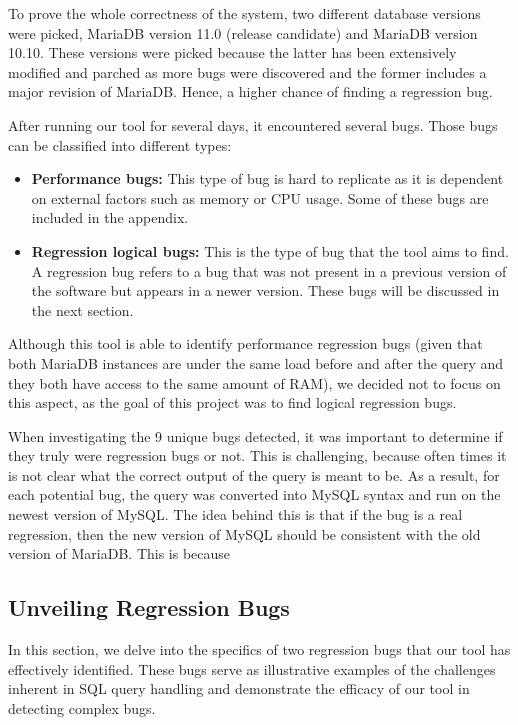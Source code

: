 \documentclass[sigconf]{acmart}
\begin{document}
To prove the whole correctness of the system, two different database versions were picked, MariaDB version 11.0 (release candidate) and MariaDB version 10.10. These versions were picked because the latter has been extensively modified and parched as more bugs were discovered and the former includes a major revision of MariaDB. Hence, a higher chance of finding a regression bug.

After running our tool for several days, it encountered several bugs. Those bugs can be classified into different types:
\begin{itemize}
    \item \textbf{Performance bugs:} This type of bug is hard to replicate as it is dependent on external factors such as memory or CPU usage. Some of these bugs are included in the appendix.
    \item \textbf{Regression logical bugs:} This is the type of bug that the tool aims to find. A regression bug refers to a bug that was not present in a previous version of the software but appears in a newer version. These bugs will be discussed in the next section.
\end{itemize}
Although this tool is able to identify performance regression bugs (given that both MariaDB instances are under the same load before and after the query and they both have access to the same amount of RAM), we decided not to focus on this aspect, as the goal of this project was to find logical regression bugs.

When investigating the 9 unique bugs detected, it was important to determine if they truly were regression bugs or not. This is challenging, because often times it is not clear what the correct output of the query is meant to be. As a result, for each potential bug, the query was converted into MySQL syntax and run on the newest version of MySQL. The idea behind this is that if the bug is a real regression, then the new version of MySQL should be consistent with the old version of MariaDB. This is because

\subsection{Unveiling Regression Bugs}

In this section, we delve into the specifics of two regression bugs that our tool has effectively identified. These bugs serve as illustrative examples of the challenges inherent in SQL query handling and demonstrate the efficacy of our tool in detecting complex bugs.
\end{document}
